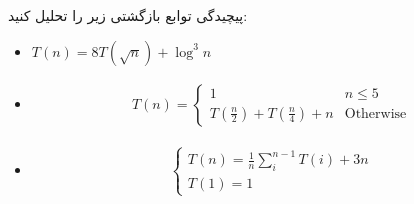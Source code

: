 پیچیدگی توابع بازگشتی زیر را تحلیل کنید:\\
\begin{LTR}
\begin{itemize}
\item $T(n) = 8T(\sqrt{n}) + \log^3 n$
\item
\begin{align*}
T(n) = 
\begin{cases}
1 & \text{$n\leqslant 5$}\\
T(\frac{n}{2}) + T(\frac{n}{4}) + n & \text{Otherwise}
\end{cases}
\end{align*}
\item \begin{align*}
\begin{cases} T(n) = \frac{1}{n}\sum^{n-1}_i T(i) + 3n \\ T(1) = 1\end{cases}
\end{align*}
\end{itemize}
\end{LTR}

